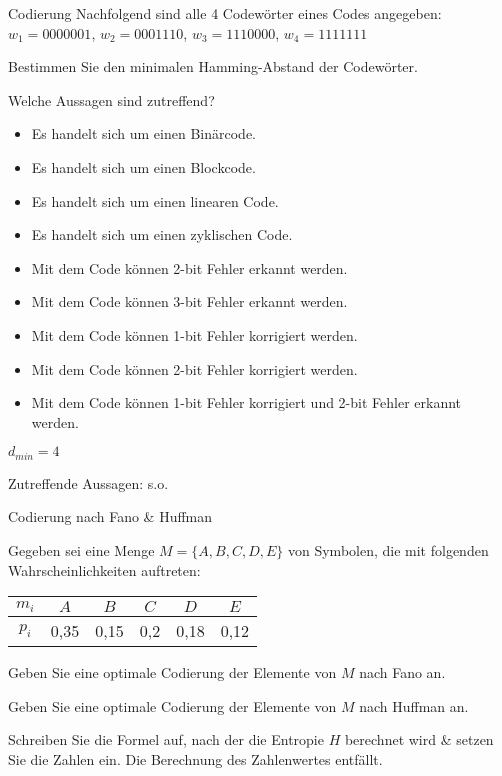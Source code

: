 \documentclass{exercisesheet}
\begin{document}
\begin{exercise*}{Codierung}{
    Nachfolgend sind alle 4 Codewörter eines Codes angegeben:
    \centering $w_1 = 0000001$, $w_2 = 0001110$, $w_3 = 1110000$, $w_4 = 1111111$
  }
  \item Bestimmen Sie den minimalen Hamming-Abstand der Codewörter.
  \item Welche Aussagen sind zutreffend?
  \begin{itemize}
    \item Es handelt sich um einen Binärcode. \solution{\checkmark}
    \item Es handelt sich um einen Blockcode. \solution{\checkmark}
    \item Es handelt sich um einen linearen Code. \solution{\xmark}
    \item Es handelt sich um einen zyklischen Code. \solution{\checkmark}
    \item Mit dem Code können 2-bit Fehler erkannt werden. \solution{\checkmark}
    \item Mit dem Code können 3-bit Fehler erkannt werden. \solution{\checkmark}
    \item Mit dem Code können 1-bit Fehler korrigiert werden. \solution{\checkmark}
    \item Mit dem Code können 2-bit Fehler korrigiert werden. \solution{\xmark}
    \item Mit dem Code können 1-bit Fehler korrigiert und 2-bit Fehler erkannt werden. \solution{\checkmark}
  \end{itemize}
\end{exercise*}

\begin{solution**}
  \item $d_{min} = 4$
  \item Zutreffende Aussagen: s.o.
\end{solution**}

\begin{exercise*}{Codierung nach Fano \& Huffman}{
    Gegeben sei eine Menge $M = \{A, B, C, D, E\}$ von Symbolen, die mit folgenden Wahrscheinlichkeiten auftreten:
    \centering\begin{tabular}{c|ccccc}
      $m_i$ & $A$  & $B$  & $C$ & $D$  & $E$  \\
      \hline
      $p_i$ & 0,35 & 0,15 & 0,2 & 0,18 & 0,12 \\
    \end{tabular}
  }
  \item Geben Sie eine optimale Codierung der Elemente von $M$ nach Fano an.
  \item Geben Sie eine optimale Codierung der Elemente von $M$ nach Huffman an.
  \item Schreiben Sie die Formel auf, nach der die Entropie $H$ berechnet wird \& setzen Sie die Zahlen ein. Die Berechnung des Zahlenwertes entfällt.
\end{exercise*}
\end{document}
